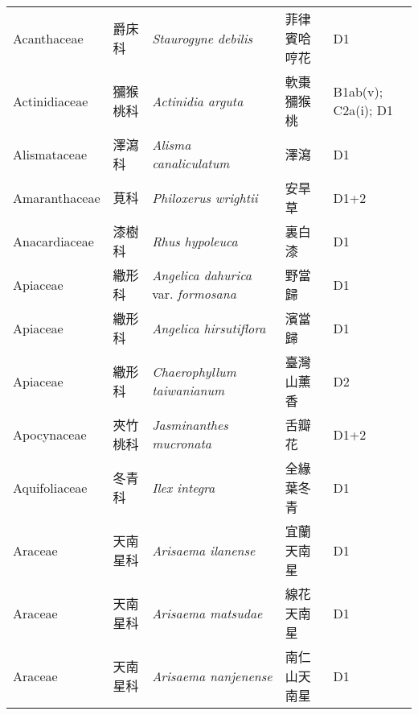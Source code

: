{\begin{longtable}{p{2.5cm}p{2.5cm}p{4.5cm}p{2.5cm}p{3cm}}
    Acanthaceae & 爵床科 & \textit{Staurogyne debilis}  & 菲律賓哈哼花 & D1 \index{Staurogyne@\textit{Staurogyne}!debilis@\textit{debilis}}  \index{菲律賓哈哼花} \\
    Actinidiaceae & 獼猴桃科 & \textit{Actinidia arguta}  & 軟棗獼猴桃 & B1ab(v); C2a(i); D1 \index{Actinidia@\textit{Actinidia}!arguta@\textit{arguta}}  \index{軟棗獼猴桃} \\
    Alismataceae & 澤瀉科 & \textit{Alisma canaliculatum}  & 澤瀉 & D1 \index{Alisma@\textit{Alisma}!canaliculatum@\textit{canaliculatum}}  \index{澤瀉} \\
    Amaranthaceae & 莧科 & \textit{Philoxerus wrightii}  & 安旱草 & D1+2 \index{Philoxerus@\textit{Philoxerus}!wrightii@\textit{wrightii}}  \index{安旱草} \\
    Anacardiaceae & 漆樹科 & \textit{Rhus hypoleuca}  & 裏白漆 & D1 \index{Rhus@\textit{Rhus}!hypoleuca@\textit{hypoleuca}}  \index{裏白漆} \\
    Apiaceae & 繖形科 & \textit{Angelica dahurica} var. \textit{formosana}  & 野當歸 & D1 \index{Angelica@\textit{Angelica}!dahurica@\textit{dahurica}!var. formosana@var. \textit{formosana}}  \index{野當歸} \\
    Apiaceae & 繖形科 & \textit{Angelica hirsutiflora}  & 濱當歸 & D1 \index{Angelica@\textit{Angelica}!hirsutiflora@\textit{hirsutiflora}}  \index{濱當歸} \\
    Apiaceae & 繖形科 & \textit{Chaerophyllum taiwanianum}  & 臺灣山薰香 & D2 \index{Chaerophyllum@\textit{Chaerophyllum}!taiwanianum@\textit{taiwanianum}}  \index{臺灣山薰香} \\
    Apocynaceae & 夾竹桃科 & \textit{Jasminanthes mucronata}  & 舌瓣花 & D1+2 \index{Jasminanthes@\textit{Jasminanthes}!mucronata@\textit{mucronata}}  \index{舌瓣花} \\
    Aquifoliaceae & 冬青科 & \textit{Ilex integra}  & 全緣葉冬青 & D1 \index{Ilex@\textit{Ilex}!integra@\textit{integra}}  \index{全緣葉冬青} \\
    Araceae & 天南星科 & \textit{Arisaema ilanense}  & 宜蘭天南星 & D1 \index{Arisaema@\textit{Arisaema}!ilanense@\textit{ilanense}}  \index{宜蘭天南星} \\
    Araceae & 天南星科 & \textit{Arisaema matsudae}  & 線花天南星 & D1 \index{Arisaema@\textit{Arisaema}!matsudae@\textit{matsudae}}  \index{線花天南星} \\
    Araceae & 天南星科 & \textit{Arisaema nanjenense}  & 南仁山天南星 & D1 \index{Arisaema@\textit{Arisaema}!nanjenense@\textit{nanjenense}}  \index{南仁山天南星} \\

\end{longtable}}
